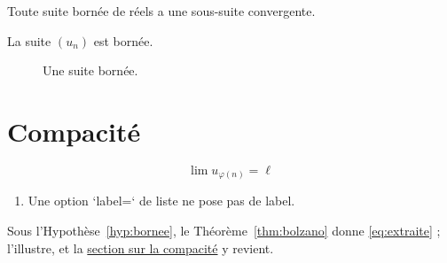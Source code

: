 \begin{theorem}[label=thm:bolzano]
  Toute suite bornée de réels a une sous-suite convergente.
\end{theorem}

\begin{assumption}[label=hyp:bornee]
  La suite $(u_n)$ est bornée.
\end{assumption}

\begin{figure}[ht!]
  \caption{Une suite bornée.}\label{fig:bornee}
\end{figure}

\section{Compacité}\label{sec:compacite}

\begin{equation}
  \lim u_{\varphi(n)} = \ell \label{eq:extraite}
\end{equation}

\begin{enumerate}[label=\alph*)]
  \item Une option `label=` de liste ne pose pas de label.
\end{enumerate}

Sous l'Hypothèse~\eqref{hyp:bornee}, le Théorème~\ref{thm:bolzano} donne
\eqref{eq:extraite} ;  l'illustre, et la
\hyperref[sec:compacite]{section sur la compacité} y revient.
